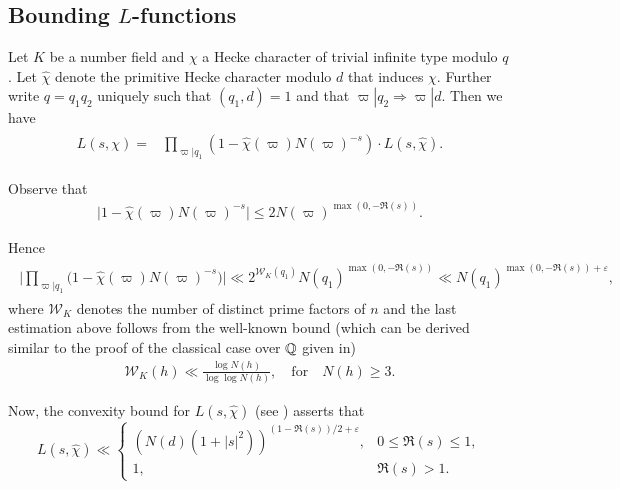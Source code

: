 \documentclass[twoside,leqno,10pt, A4]{amsart}
\begin{document}
\subsection{Bounding $L$-functions}
\label{sec: Lbound}

 Let $K$ be a number field and $\chi$ a Hecke character of trivial infinite type modulo $q$.  Let $\widehat{\chi}$ denote the primitive Hecke character modulo $d$ that induces $\chi$.  Further write $q=q_1q_2$ uniquely such that $(q_1, d)=1$ and that $\varpi |q_2 \Rightarrow \varpi|d$. Then we have
\begin{align}
\label{Ldecomp}
\begin{split}
	L(s,  \chi )=&	\prod_{\varpi | q_1}(1-\widehat{\chi}(\varpi)N(\varpi)^{-s}) \cdot
L(s, \widehat{\chi}).
\end{split}
\end{align}

  Observe that
\begin{align*}
 \Big |1-\widehat{\chi}(\varpi)N(\varpi)^{-s}\Big | \leq 2N(\varpi)^{\max (0,-\Re(s))}.
\end{align*}

Hence
\begin{align}
\label{Lnbound}
\begin{split}
 \Big | \prod_{\varpi | q_1}\Big(1-\widehat{\chi}(\varpi)N(\varpi)^{-s} \Big )\Big | \ll
2^{\mathcal{W}_K(q_1)}N(q_1)^{\max (0,-\Re(s))} \ll N(q_1)^{\max (0,-\Re(s))+\varepsilon},
\end{split}
\end{align}
  where $\mathcal{W}_K$ denotes the number of distinct prime factors of $n$ and the last estimation above follows from the well-known bound
(which can be derived similar to the proof of the classical case over $\mathbb Q$ given in\cite[Theorem 2.10]{MVa1})
\begin{align*}
   \mathcal{W}_K(h) \ll \frac {\log N(h)}{\log \log N(h)}, \quad \mbox{for} \quad N(h) \geq 3.
\end{align*}

 Now, the convexity bound for $L(s, \widehat \chi)$ (see \cite[Exercise 3, p. 100]{iwakow}) asserts that
\begin{equation} \label{Lconvexbound}
L( s,  \widehat \chi) \ll
\begin{cases}
\left( N(d)(1+|s|^2) \right)^{(1-\Re(s))/2+\varepsilon}, & 0 \leq \Re(s) \leq 1, \\ 1, & \Re(s)>1.
\end{cases}
\end{equation}
\end{document}
